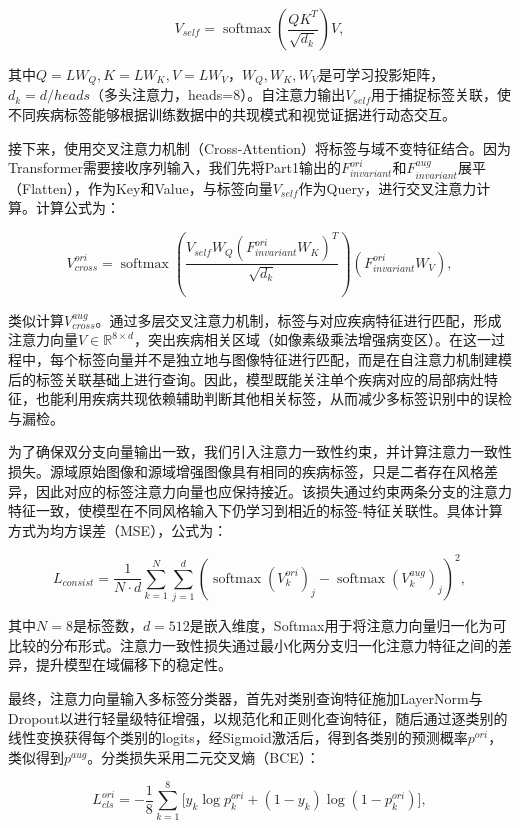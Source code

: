 \[
V_{self} = \operatorname{softmax}\left(\frac{QK^{T}}{\sqrt{d_{k}}}\right)V,
\]

其中\(Q = LW_{Q},K = LW_{K},V = LW_{V}\)，\(W_{Q},W_{K},W_{V}\)是可学习投影矩阵，\(d_{k} = d/heads\)（多头注意力，heads=8）。自注意力输出\(V_{self}\)用于捕捉标签关联，使不同疾病标签能够根据训练数据中的共现模式和视觉证据进行动态交互。

接下来，使用交叉注意力机制（Cross-Attention）将标签与域不变特征结合。因为Transformer需要接收序列输入，我们先将Part1输出的\(F_{invariant}^{ori}\)和\(F_{invariant}^{aug}\)展平（Flatten），作为Key和Value，与标签向量\(V_{self}\)作为Query，进行交叉注意力计算。计算公式为：

\[
V_{cross}^{ori} = \operatorname{softmax}\left(\frac{V_{self}W_{Q}(F_{invariant}^{ori}W_{K})^{T}}{\sqrt{d_{k}}}\right)(F_{invariant}^{ori}W_{V}),
\]

类似计算\(V_{cross}^{aug}\)。通过多层交叉注意力机制，标签与对应疾病特征进行匹配，形成注意力向量\(V \in \mathbb{R}^{8 \times d}\)，突出疾病相关区域（如像素级乘法增强病变区）。在这一过程中，每个标签向量并不是独立地与图像特征进行匹配，而是在自注意力机制建模后的标签关联基础上进行查询。因此，模型既能关注单个疾病对应的局部病灶特征，也能利用疾病共现依赖辅助判断其他相关标签，从而减少多标签识别中的误检与漏检。

为了确保双分支向量输出一致，我们引入注意力一致性约束，并计算注意力一致性损失。源域原始图像和源域增强图像具有相同的疾病标签，只是二者存在风格差异，因此对应的标签注意力向量也应保持接近。该损失通过约束两条分支的注意力特征一致，使模型在不同风格输入下仍学习到相近的标签-特征关联性。具体计算方式为均方误差（MSE），公式为：

\[
L_{consist} = \frac{1}{N \cdot d}\sum_{k = 1}^{N}\sum_{j = 1}^{d}
\left(
\operatorname{softmax}\left( V_{k}^{ori} \right)_{j}
-
\operatorname{softmax}\left( V_{k}^{aug} \right)_{j}
\right)^{2},
\]

其中\(N = 8\)是标签数，\(d = 512\)是嵌入维度，Softmax用于将注意力向量归一化为可比较的分布形式。注意力一致性损失通过最小化两分支归一化注意力特征之间的差异，提升模型在域偏移下的稳定性。

最终，注意力向量输入多标签分类器，首先对类别查询特征施加LayerNorm与Dropout以进行轻量级特征增强，以规范化和正则化查询特征，随后通过逐类别的线性变换获得每个类别的logits，经Sigmoid激活后，得到各类别的预测概率\(p^{ori}\)，类似得到\(p^{aug}\)。分类损失采用二元交叉熵（BCE）：

\[L_{cls}^{ori} = - \frac{1}{8}\sum_{k = 1}^{8}{\lbrack y_{k}\log p_{k}^{ori} + (1 - y_{k})\log(1 - p_{k}^{ori})\rbrack},
\]

